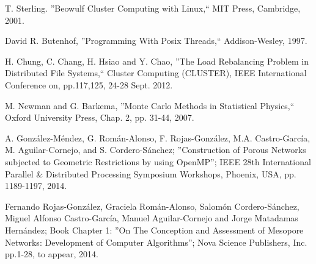 \begin{thebibliography}{9}
 T. Sterling. ''Beowulf Cluster Computing with Linux,`` MIT Press, Cambridge, 2001.

David R. Butenhof, ''Programming With Posix Threads,`` Addison-Wesley, 1997.

H. Chung, C. Chang, H. Hsiao and Y. Chao, ''The Load Rebalancing Problem in Distributed File Systems,`` Cluster Computing (CLUSTER), IEEE International Conference on, pp.117,125, 24-28 Sept. 2012.

M. Newman and G. Barkema, ''Monte Carlo Methods in Statistical Physics,`` Oxford University Press, Chap. 2, pp. 31-44, 2007.

A. Gonz\'alez-M\'endez, G. Rom\'an-Alonso, F. Rojas-Gonz\'alez, M.A. Castro-Garc\'ia, M. Aguilar-Cornejo, and S. Cordero-S\'anchez;
''Construction of Porous Networks subjected to Geometric Restrictions by using OpenMP''; IEEE 28th
International Parallel \& Distributed Processing Symposium Workshops, Phoenix, USA, pp. 1189-1197, 2014.

Fernando Rojas-Gonz\'alez, Graciela Rom\'an-Alonso, Salom\'on Cordero-S\'anchez, Miguel Alfonso Castro-Garc\'ia, Manuel Aguilar-Cornejo and Jorge Matadamas Hern\'andez; Book Chapter 1: ''On The Conception and Assessment of Mesopore Networks: Development of Computer Algorithms''; Nova Science Publishers, Inc. pp.1-28, to appear, 2014.




\end{thebibliography}
